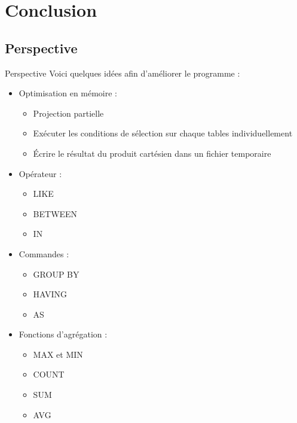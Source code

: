 \documentclass[10pt,handout]{beamer}
\begin{document}
\section{Conclusion}

\subsection{Perspective}

\begin{frame}{Perspective}
Voici quelques idées afin d'améliorer le programme :
\begin{itemize}
  \item Optimisation en mémoire :
  \begin{itemize}
    \item Projection partielle
    \item Exécuter les conditions de sélection sur chaque tables individuellement
    \item Écrire le résultat du produit cartésien dans un fichier temporaire
  \end{itemize}
  \item Opérateur :
  \begin{itemize}
    \item LIKE
    \item BETWEEN
    \item IN
  \end{itemize}
  \item Commandes :
  \begin{itemize}
    \item GROUP BY
    \item HAVING
    \item AS
  \end{itemize}
  \item Fonctions d’agrégation :
  \begin{itemize}
    \item MAX et MIN
    \item COUNT
    \item SUM
    \item AVG
  \end{itemize}
\end{itemize}
\end{frame}
\end{document}

